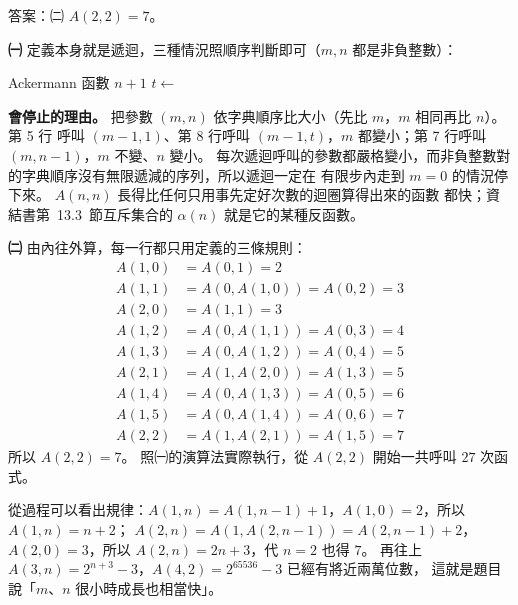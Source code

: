 \begin{pastsoln}
答案：㈡ $A(2, 2) = 7$。

\textbf{㈠} 定義本身就是遞迴，三種情況照順序判斷即可（$m, n$ 都是非負整數）：
\begin{pseudo}{Ackermann 函數}
        \State \Return $n + 1$
        \State \Return {}
    \Else
        \State $t \gets$  
        \State \Return {}
    \EndIf
\EndFunction
\end{pseudo}
\textbf{會停止的理由。} 把參數 $(m, n)$ 依字典順序比大小（先比 $m$，$m$ 相同再比 $n$）。 第 5 行
呼叫 $(m - 1, 1)$、第 8 行呼叫 $(m - 1, t)$，$m$ 都變小；第 7 行呼叫 $(m, n - 1)$，$m$ 不變、$n$
變小。 每次遞迴呼叫的參數都嚴格變小，而非負整數對的字典順序沒有無限遞減的序列，所以遞迴一定在
有限步內走到 $m = 0$ 的情況停下來。 $A(n, n)$ 長得比任何只用事先定好次數的迴圈算得出來的函數
都快；資結書第~13.3~節互斥集合的 $\alpha(n)$ 就是它的某種反函數。

\textbf{㈡} 由內往外算，每一行都只用定義的三條規則：
\begin{align*}
A(1, 0) &= A(0, 1) = 2 \\
A(1, 1) &= A(0, A(1, 0)) = A(0, 2) = 3 \\
A(2, 0) &= A(1, 1) = 3 \\
A(1, 2) &= A(0, A(1, 1)) = A(0, 3) = 4 \\
A(1, 3) &= A(0, A(1, 2)) = A(0, 4) = 5 \\
A(2, 1) &= A(1, A(2, 0)) = A(1, 3) = 5 \\
A(1, 4) &= A(0, A(1, 3)) = A(0, 5) = 6 \\
A(1, 5) &= A(0, A(1, 4)) = A(0, 6) = 7 \\
A(2, 2) &= A(1, A(2, 1)) = A(1, 5) = 7
\end{align*}
所以 $A(2, 2) = 7$。 照㈠的演算法實際執行，從 $A(2, 2)$ 開始一共呼叫 $27$ 次函式。

從過程可以看出規律：$A(1, n) = A(1, n - 1) + 1$，$A(1, 0) = 2$，所以 $A(1, n) = n + 2$；
$A(2, n) = A(1, A(2, n - 1)) = A(2, n - 1) + 2$，$A(2, 0) = 3$，所以 $A(2, n) = 2n + 3$，代
$n = 2$ 也得 $7$。 再往上 $A(3, n) = 2^{n+3} - 3$，$A(4, 2) = 2^{65536} - 3$ 已經有將近兩萬位數，
這就是題目說「$m$、$n$ 很小時成長也相當快」。
\end{pastsoln}
